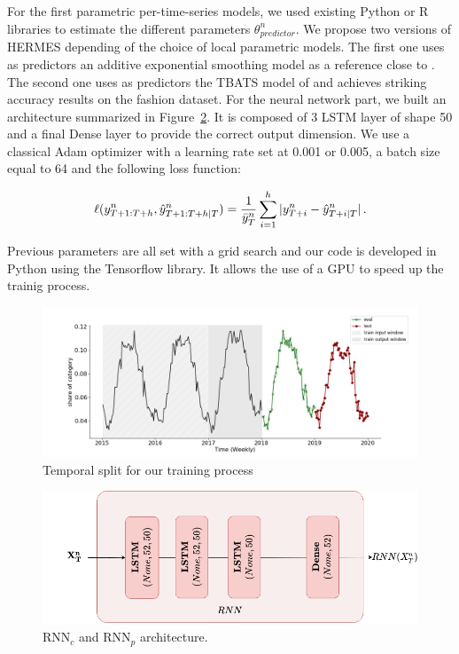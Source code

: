 \documentclass{article} %
\newcommand{\ts}{y}
\newcommand{\tspred}{\hat{\ts}}
\newcommand{\statparam}{\theta_{predictor}}
\newcommand{\lag}{h}
\newcommand{\meants}{\Bar{\ts}}
\newcommand{\predictor}{\mathrm{RNN}_p}
\newcommand{\classifier}{\mathrm{RNN}_c}
\begin{document}
For the first parametric per-time-series models, we used existing Python or R libraries to estimate the different parameters $\statparam^n$. %
We propose two versions of HERMES depending of the choice of local parametric models. The first one uses as predictors an additive exponential smoothing model as a reference close to \cite{smyl2020hybrid}. The second one uses as predictors the TBATS model of \cite{doi:10.1198/jasa.2011.tm09771} and  achieves striking accuracy results on the fashion dataset. For the neural network part, we built an architecture summarized in Figure~\ref{fig:rnn_architecture}. It is composed of 3 LSTM layer of shape 50 and a final Dense layer to provide the correct output dimension. We use a classical Adam optimizer with a learning rate set at 0.001 or 0.005, a batch size equal to 64 and the following loss function:

$$
\ell(\ts^n_{T+1:T+\lag},\tspred^n_{T+1:T+\lag|T}) = \frac{1}{\meants^n_T}\sum_{i=1}^{\lag}|\ts^n_{T+i} - \tspred^n_{T+i|T}|\,.
$$
%


Previous parameters are all set with a grid search and our code is developed in Python using the Tensorflow library. It allows the use of a GPU to speed up the trainig process.



\begin{figure}
  \centering
    \includegraphics[width=1.\linewidth]{figure/train_eval_test_set}
  \caption{Temporal split for our training process}
\label{fig:train_eval_test_set}
\end{figure}

\begin{figure}
  \centering
    \includegraphics[width=0.8\linewidth]{figure/lstm_archi}
  \caption{$\classifier$ and $\predictor$ architecture.}
\label{fig:rnn_architecture}
\end{figure}
\end{document}
